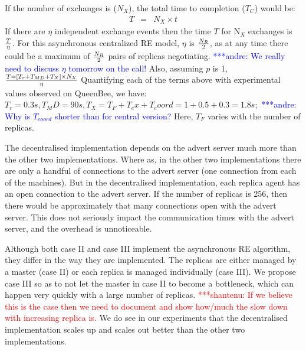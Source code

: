 \documentclass{rspublic}
\newcommand{\jhanote}[1]{ {\textcolor{red} { ***shantenu: #1 }}}
\newcommand{\alnote}[1]{ {\textcolor{blue} { ***andre: #1 }}}
\newcommand{\alnote}[1]{}
\newcommand{\jhanote}[1]{}
\begin{document}
If the number of exchanges is ($N_{X}$), the total time to completion ($T_{C}$) would be:
\begin{eqnarray}
T &=& N_{X} \times t 
\label{eq:decentr}
\end{eqnarray}
If there are $\eta$ independent exchange events then the time $T$ for 
N$_X$ exchanges is $T \over \eta$. For this asynchronous centralized RE model, $\eta$ is $N_R \over 2$, as at any time there could be a maximum of $N_R \over 2$ pairs of replicas negotiating.  \alnote{We really need to discuss $\eta$ tomorrow on the call!}
Also, assuming $p$ is 1, $T = [T_r+T_{MD} + T_{X} ] \times N_{X} \over \eta$
Quantifying each of the terms above with experimental values observed on QueenBee, we have:
$T_r = 0.3 s, T_MD=90 s, T_X=T_F+T_ex+T_coord=1+0.5+0.3=1.8 s; $ \alnote{Why is $T_{coord}$ shorter than for central version?}
Here, $T_F$ varies with the number of replicas. 





The decentralised implementation depends on the advert server much
more than the other two implementations. Where as, in the other two
implementations there are only a handful of connections to the advert
server (one connection from each of the machines). But in the
decentralised implementation, each replica agent has an open
connection to the advert server. If the number of replicas is 256,
then there would be approximately that many connections open with the
advert server. This does not seriously impact the communication times
with the advert server, and the overhead is unnoticeable.

Although both case II and case III implement the asynchronous RE
algorithm, they differ in the way they are implemented. The replicas
are either managed by a master (case II) or each replica is managed
individually (case III). We propose case III so as to not let the
master in case II to become a bottleneck, which can happen very
quickly with a large number of replicas. \jhanote{If we believe this
  is the case then we need to document and show how/much the slow down
  with increasing replica is.} We do see in our experiments that the
decentralised implementation scales up and scales out better than the
other two implementations.
\end{document}

